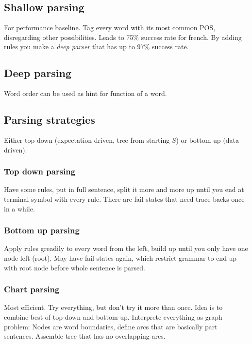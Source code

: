 \documentclass[11pt]{article}
\begin{document}
\subsection{Shallow parsing}
For performance baseline. Tag every word with its most common POS, disregarding other
possibilities. Leads to 75\% success rate for french. By adding rules you make
a \emph{deep parser} that has up to 97\% success rate.

\subsection{Deep parsing}
Word order can be used as hint for function of a word.

\subsection{Parsing strategies}
Either top down (expectation driven, tree from starting $S$) or bottom up (data driven).

\subsubsection{Top down parsing}
Have some rules, put in full sentence, split it more and more up until you end at
terminal symbol with every rule. There are fail states that need trace backs once in a while.

\subsubsection{Bottom up parsing}
Apply rules greadily to every word from the left, build up until you only have one node
left (root). May have fail states again, which restrict grammar to end up with root
node before whole sentence is parsed.

\subsubsection{Chart parsing}
Most efficient. Try everything, but don't try it more than once. Idea is to combine best 
of top-down and bottom-up. Interprete everything as graph problem: Nodes are word boundaries,
define arcs that are basically part sentences. Assemble tree that has no overlapping
arcs.
\end{document}
